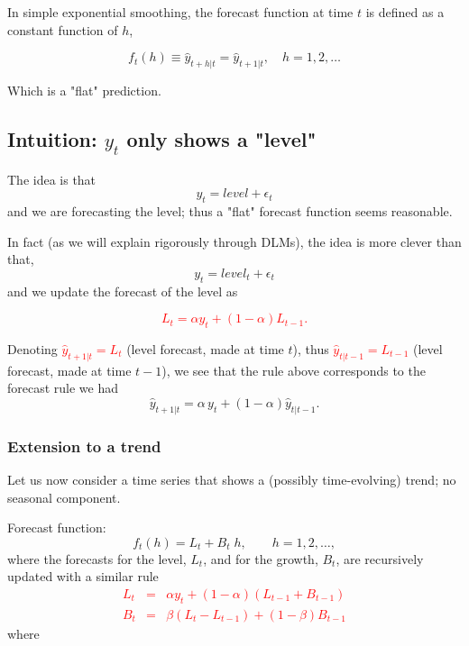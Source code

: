 \documentclass[dvipsnames,12pt]{book}
\begin{document}
            In simple exponential smoothing, the forecast function at time $t$ is defined as a constant function of $h$,

            \begin{equation}
                f_t(h) \equiv \hat{y}_{t+h | t} = \hat{y}_{t+1 | t}, \quad h=1, 2, \ldots
            \end{equation}

            Which is a "flat" prediction.

            \subsection{Intuition: $y_t$ only shows a "level"}

                The idea is that 
                $$ y_t = level+ \epsilon_t $$
                and we are forecasting the level; thus a "flat" forecast function seems reasonable.
                
                In fact (as we will explain rigorously through DLMs), the idea is more clever than that, 
                $$ y_t = level_t + \epsilon_t $$
                and we update the forecast of the level as

                \textcolor{red}{$$L_t = \alpha y_t + (1-\alpha) L_{t-1} .$$}

                Denoting \textcolor{red}{$\hat{y}_{t+1 | t} = L_t $} (level forecast, made at time $t$),  thus 
                \textcolor{red}{$\hat{y}_{t | t -1 }= L_{t-1}$} (level forecast, made at time $t-1$),
                we see that the rule above corresponds to the forecast rule we had
                $$ \hat{y}_{t+1 | t} = \alpha \, y_t + (1-\alpha) \hat{y}_{t | t-1}. $$

                \subsubsection{Extension to a trend}

                    Let us now consider a time series that shows a (possibly time-evolving) trend; no seasonal component. 
                    
                    Forecast function:
                    $$ f_t (h) = L_t + B_t \; h, \quad \quad  h=1, 2, \ldots , $$
                      where the forecasts for the level, $L_t$, and for the growth, $B_t$, are recursively updated with a similar rule
                    \textcolor{red}{\begin{eqnarray}
                      L_t &=& \alpha y_t + (1-\alpha) (L_{t-1} + B_{t-1})\\
                      B_t &=& \beta (L_t - L_{t-1}) + (1-\beta) B_{t-1}
                      \end{eqnarray}}
                    where
    
\end{document}
